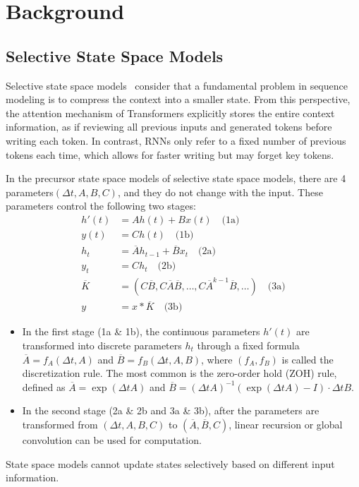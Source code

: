 \documentclass{article}
\theoremstyle{plain}
\theoremstyle{definition}
\theoremstyle{remark}
\begin{document}
\section{Background}
\subsection{Selective State Space Models}


Selective state space models~\cite{gu2023mamba} consider that a fundamental problem in sequence modeling is to compress the context into a smaller state. From this perspective, the attention mechanism of Transformers explicitly stores the entire context information, as if reviewing all previous inputs and generated tokens before writing each token. In contrast, RNNs only refer to a fixed number of previous tokens each time, which allows for faster writing but may forget key tokens.

In the precursor state space models of selective state space models, there are 4 parameters$(\Delta t, A, B, C)$, and they do not change with the input. These parameters control the following two stages:
\begin{align}
   h'(t) &= Ah(t) + Bx(t) \quad \text{(1a)} \nonumber \\
   y(t) &= Ch(t) \quad \text{(1b)} \nonumber \\
   h_t &= \overline{A}h_{t-1} + \overline{B}x_t \quad \text{(2a)} \nonumber \\
   y_t &= Ch_t \quad \text{(2b)} \nonumber \\
   \overline{K} &= (C\overline{B}, C\overline{A}\overline{B}, \ldots, C\overline{A}^{k-1}\overline{B}, \ldots) \quad \text{(3a)} \nonumber \\
   y &= x * \overline{K} \quad \text{(3b)} \nonumber
\end{align}
\begin{itemize}
   \item In the first stage (1a \& 1b), the continuous parameters $h'(t)$ are transformed into discrete parameters $h_t$ through a fixed formula $\overline{A} = f_A(\Delta t, A)$ and $\overline{B} = f_B(\Delta t, A, B)$, where $(f_A, f_B)$ is called the discretization rule. The most common is the zero-order hold (ZOH) rule, defined as $\overline{A} = \exp(\Delta t A)$ and $\overline{B} = (\Delta t A)^{-1} (\exp(\Delta t A) - I) \cdot \Delta t B$.
   \item In the second stage (2a \& 2b and 3a \& 3b), after the parameters are transformed from $(\Delta t, A, B, C)$ to $(\overline{A}, \overline{B}, C)$, linear recursion or global convolution can be used for computation.
\end{itemize}
State space models cannot update states selectively based on different input information.
\end{document}
